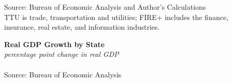 \documentclass{report}
\begin{document}
\begin{minipage}{1.0\textwidth}
\footnotesize{Source: Bureau of Economic Analysis and Author's Calculations \\ TTU is trade, transportation and utilities; FIRE+ includes the finance, insurance, real estate, and information industries. }
\end{minipage}
\newpage 
\vspace{-4mm}

\noindent \normalsize \textbf{Real GDP Growth by State}\\
\footnotesize{\textit{percentage point change in real GDP}}\\
\vspace{-2mm}
\hspace{-12mm}  \\
\footnotesize{Source: Bureau of Economic Analysis}

\begin{minipage}{1.0\textwidth} 
\small  
\end{minipage}
\vspace{2mm}
\end{document}
